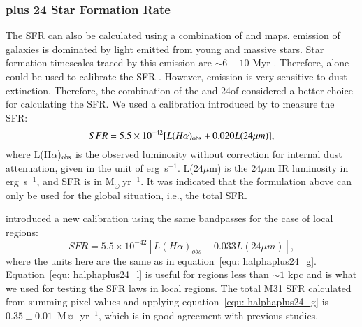 \subsubsection{\halpha plus 24 \um Star Formation Rate}
\label{sec:sfr_halpha}

The SFR can also be calculated using a combination of \halpha and  \um maps. \halpha emission of galaxies is dominated by light emitted from young and massive stars. Star formation timescales traced by this emission are $\sim 6-10$ Myr \citep[e.g.][]{Kennicutt09, Calzetti13}. Therefore, \halpha alone could be used to calibrate the SFR \citep[e.g.][]{Osterbrock06, Kennicutt09}. However, \halpha emission is very sensitive to dust extinction. Therefore, the combination of the \halpha and 24\um of considered a better choice for calculating the SFR. We used a calibration introduced by \citet{Kennicutt09} to measure the SFR:
\begin{equation}
\label{equ: halphaplus24_g}
SFR = 5.5 \times 10^{-42}[L(H{\alpha})_{\rm obs} + 0.020L(24\mu m)],
\end{equation}
\noindent where L(H${\alpha}$)$_{\rm obs}$ is the observed \halpha luminosity without correction for internal dust attenuation, given in the unit of erg~s$^{-1}$. L(24$\mu$m) is the $24\mu$m IR luminosity in erg~s$^{-1}$, and SFR is in M$_{\odot}~$yr$^{-1}$. It was indicated that the formulation above can only be used for the global situation, i.e., the total SFR.

\citet{Calzetti07} introduced a new calibration using the same bandpasses for the case of local regions:
\begin{equation}
\label{equ: halphaplus24_l}
SFR = 5.5 \times 10^{-42}[L(H{\alpha})_{obs} + 0.033L(24\mu m)],
\end{equation}
\noindent where the units here are the same as in equation~\ref{equ: halphaplus24_g}. Equation~\ref{equ: halphaplus24_l} is useful for regions less than $\sim 1$ kpc and is what we used for testing the SFR laws in local regions. The total M31 SFR calculated from summing pixel values and applying equation~\ref{equ: halphaplus24_g} is $0.35 \pm 0.01$~M$\sun$~yr$^{-1}$, which is in good agreement with previous studies.

